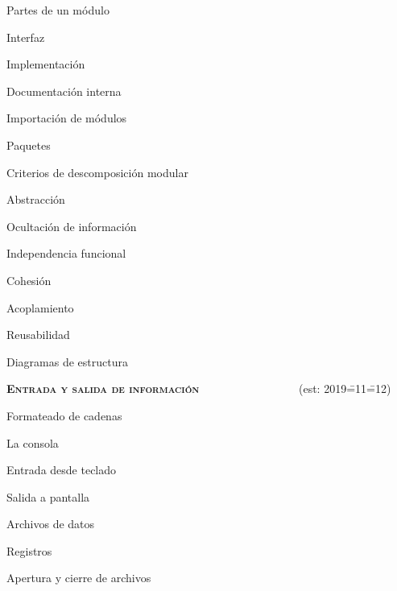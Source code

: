 \begin{longenum}
\begin{longenum}
\begin{longenum}
        \end{longenum}
        \item Partes de un módulo
        \begin{longenum}
            \item Interfaz
            \item Implementación
            \item Documentación interna
        \end{longenum}
        \item Importación de módulos
        \item Paquetes
        \item Criterios de descomposición modular
        \begin{longenum}
            \item Abstracción
            \item Ocultación de información
            \item Independencia funcional
            \begin{longenum}
                \item Cohesión
                \item Acoplamiento
            \end{longenum}
            \item Reusabilidad
        \end{longenum}
        \item Diagramas de estructura
    \end{longenum}
    \item \textbf{\textsc{Entrada y salida de información}} \ \ \ \ \ \ \ \ \ \ \ \ \ \ \ \ \ (est: 2019\==11\==12)
    \begin{longenum}
        \item Formateado de cadenas
        \item La consola
        \begin{longenum}
            \item Entrada desde teclado
            \item Salida a pantalla
        \end{longenum}
        \item Archivos de datos
        \begin{longenum}
            \item Registros
            \item Apertura y cierre de archivos

\end{longenum}
\end{longenum}
\end{longenum}
